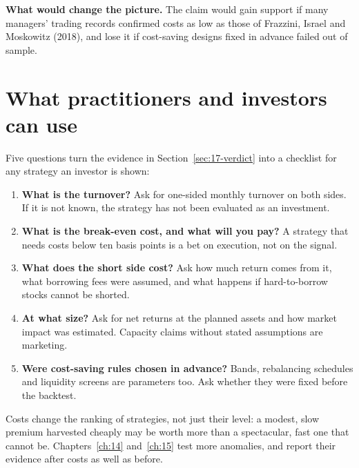 \textbf{What would change the picture.} The claim would gain support if many managers' trading records confirmed costs as low as those of Frazzini, Israel and Moskowitz (2018), and lose it if cost-saving designs fixed in advance failed out of sample.

\section{What practitioners and investors can use}
\label{sec:17-investors}

Five questions turn the evidence in Section~\ref{sec:17-verdict} into a checklist for any strategy an investor is shown:

\begin{enumerate}
  \item \textbf{What is the turnover?} Ask for one-sided monthly turnover on both sides. If it is not known, the strategy has not been evaluated as an investment.
  \item \textbf{What is the break-even cost, and what will you pay?} A strategy that needs costs below ten basis points is a bet on execution, not on the signal.
  \item \textbf{What does the short side cost?} Ask how much return comes from it, what borrowing fees were assumed, and what happens if hard-to-borrow stocks cannot be shorted.
  \item \textbf{At what size?} Ask for net returns at the planned assets and how market impact was estimated. Capacity claims without stated assumptions are marketing.
  \item \textbf{Were cost-saving rules chosen in advance?} Bands, rebalancing schedules and liquidity screens are parameters too. Ask whether they were fixed before the backtest.
\end{enumerate}

Costs change the ranking of strategies, not just their level: a modest, slow premium harvested cheaply may be worth more than a spectacular, fast one that cannot be. Chapters~\ref{ch:14} and~\ref{ch:15} test more anomalies, and report their evidence after costs as well as before.
